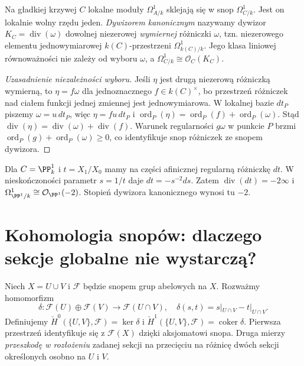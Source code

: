 \begin{definicja}
Na gładkiej krzywej $C$ lokalne moduły
$\Omega^1_{A/k}$ sklejają się w snop
$\Omega^1_{C/k}$. Jest on lokalnie wolny rzędu
jeden. \emph{Dywizorem kanonicznym} nazywamy
dywizor $K_C=\operatorname{div}(\omega)$
dowolnej niezerowej \emph{wymiernej} różniczki
$\omega$, tzn. niezerowego elementu
jednowymiarowej $k(C)$-przestrzeni
$\Omega^1_{k(C)/k}$. Jego klasa liniowej
równoważności nie zależy od wyboru $\omega$,
a $\Omega^1_{C/k}\cong\mathcal O_C(K_C)$.
\end{definicja}

\begin{proof}[Uzasadnienie niezależności wyboru]
Jeśli $\eta$ jest drugą niezerową różniczką wymierną,
to $\eta=f\omega$ dla jednoznacznego $f\in k(C)^\times$,
bo przestrzeń różniczek nad ciałem funkcji jednej
zmiennej jest jednowymiarowa. W lokalnej bazie $dt_P$
piszemy $\omega=u\,dt_P$, więc
$\eta=fu\,dt_P$ i
$\operatorname{ord}_P(\eta)=\operatorname{ord}_P(f)+
\operatorname{ord}_P(\omega)$. Stąd
$\operatorname{div}(\eta)=\operatorname{div}(\omega)+
\operatorname{div}(f)$. Warunek regularności $g\omega$
w punkcie $P$ brzmi
$\operatorname{ord}_P(g)+\operatorname{ord}_P(\omega)\ge0$,
co identyfikuje snop różniczek ze snopem dywizora.
\end{proof}

\begin{przyklad}
Dla $C=\PP^1_k$ i $t=X_1/X_0$ mamy na
części afinicznej regularną różniczkę $dt$.
W nieskończoności parametr $s=1/t$ daje
$dt=-s^{-2}ds$. Zatem
$\operatorname{div}(dt)=-2\infty$ i
$\Omega^1_{\PP^1/k}\cong\mathcal O_{\PP^1}(-2)$.
Stopień dywizora kanonicznego wynosi tu $-2$.
\end{przyklad}

\section{Kohomologia snopów: dlaczego sekcje globalne nie wystarczą?}
\label{sec:cech-curve}

\begin{definicja}
Niech $X=U\cup V$ i $\mathcal F$ będzie snopem
grup abelowych na $X$. Rozważmy homomorfizm
\[
 \delta:\mathcal F(U)\oplus\mathcal F(V)
 \longrightarrow\mathcal F(U\cap V),\quad
 \delta(s,t)=s|_{U\cap V}-t|_{U\cap V}.
\]
Definiujemy $\check H^0(\{U,V\},\mathcal F)=\ker\delta$
i $\check H^1(\{U,V\},\mathcal F)=\operatorname{coker}\delta$.
Pierwsza przestrzeń identyfikuje się z $\mathcal F(X)$
dzięki aksjomatowi snopa. Druga mierzy \emph{przeszkodę
w rozłożeniu} zadanej sekcji na przecięciu na
różnicę dwóch sekcji określonych osobno na $U$ i $V$.
\end{definicja}

